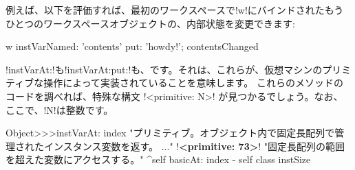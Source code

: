 \documentclass[a4paper,10pt,twoside]{book}
\begin{document}
例えば、以下を評価すれば、最初のワークスペースで\ct!w!にバインドされたもうひとつのワークスペースオブジェクトの、内部状態を変更できます:
\begin{code}{}
w instVarNamed: 'contents' put: 'howdy!'; contentsChanged
\end{code}


\ct!instVarAt:!も\ct!instVarAt:put:!も、です。それは、これらが、\pharo{}仮想マシンのプリミティブな操作によって実装されていることを意味します。
これらのメソッドのコードを調べれば、特殊な構文 \ct!<primitive: N>! が見つかるでしょう。なお、ここで、\ct!N!は整数です。

\begin{code}{}
Object>>>instVarAt: index 
	"プリミティブ。オブジェクト内で固定長配列で管理されたインスタンス変数を返す。 ..."
	!\textbf{<primitive: 73>}!
	"固定長配列の範囲を超えた変数にアクセスする。"
	^self basicAt: index - self class instSize		
\end{code}
\end{document}
